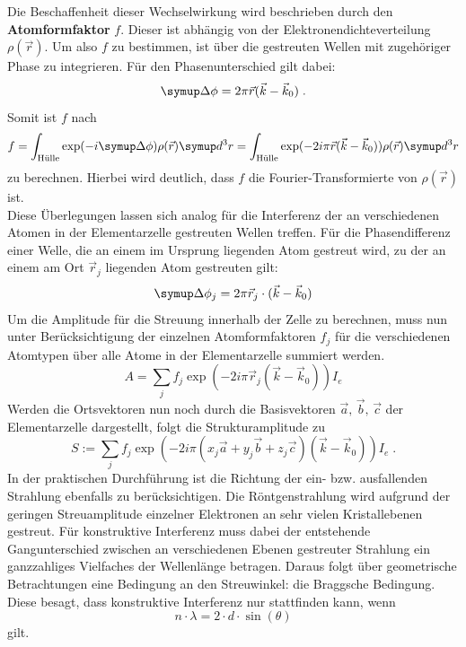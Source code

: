 Die Beschaffenheit dieser Wechselwirkung wird beschrieben durch den \textbf{Atomformfaktor} $f$. Dieser ist abhängig von
der Elektronendichteverteilung $\rho(\vec{r})$. Um also $f$ zu bestimmen, ist über die gestreuten Wellen mit zugehöriger
Phase zu integrieren. Für den Phasenunterschied gilt dabei:
%
\begin{equation}
  \upD\phi=2\pi\vec{r}(\vec{k}-\vec{k}_0) \; .
\end{equation}
%
Somit ist $f$ nach
%
\begin{equation}
  f=\int_\text{Hülle}\exp(-i\upD\phi)\rho(\vec{r})\upd^3r=\int_\text{Hülle}\exp(-2i\pi\vec{r}(\vec{k}-\vec{k}_0))\rho(\vec{r})\upd^3r
\end{equation}
%
zu berechnen. Hierbei wird deutlich, dass $f$ die Fourier-Transformierte von $\rho(\vec{r})$ ist.\\
Diese Überlegungen lassen sich analog für die Interferenz der an verschiedenen Atomen in der Elementarzelle gestreuten Wellen treffen.
Für die Phasendifferenz einer Welle, die an einem im Ursprung liegenden Atom gestreut wird, zu der an einem am Ort $\vec{r}_j$
liegenden Atom gestreuten gilt:
%
\begin{equation}
  \upD\phi_j=2\pi\vec{r}_j\cdot(\vec{k}-\vec{k}_0)
\end{equation}
%
Um die Amplitude für die Streuung innerhalb der Zelle zu berechnen, muss nun unter Berücksichtigung der einzelnen Atomformfaktoren
$f_j$ für die verschiedenen Atomtypen über alle Atome in der Elementarzelle summiert werden.
%
\begin{equation}
  A=\sum_jf_j\exp(-2i\pi\vec{r}_j(\vec{k}-\vec{k}_0))I_e
\end{equation}
%
Werden die Ortsvektoren nun noch durch die Basisvektoren $\vec{a},\,\vec{b},\,\vec{c}$ der Elementarzelle dargestellt, folgt
die Strukturamplitude zu
%
\begin{equation}
  S:=\sum_jf_j\exp(-2i\pi(x_j\vec{a}+y_j\vec{b}+z_j\vec{c})(\vec{k}-\vec{k}_0))I_e \; .
  \label{eq:strukturamplitude}
\end{equation}
%
In der praktischen Durchführung ist die Richtung der ein- bzw. ausfallenden Strahlung ebenfalls zu berücksichtigen. Die Röntgenstrahlung wird aufgrund
der geringen Streuamplitude einzelner Elektronen an sehr vielen Kristallebenen gestreut. Für konstruktive Interferenz muss dabei der
entstehende Gangunterschied zwischen an verschiedenen Ebenen gestreuter Strahlung ein ganzzahliges Vielfaches der Wellenlänge betragen.
Daraus folgt über geometrische Betrachtungen eine Bedingung an den Streuwinkel: die Braggsche Bedingung. Diese besagt, dass konstruktive
Interferenz nur stattfinden kann, wenn
%
\begin{equation}
  n\cdot\lambda=2\cdot d\cdot\sin(\theta)
  \label{eq:bragg}
\end{equation}
%
gilt.
%
